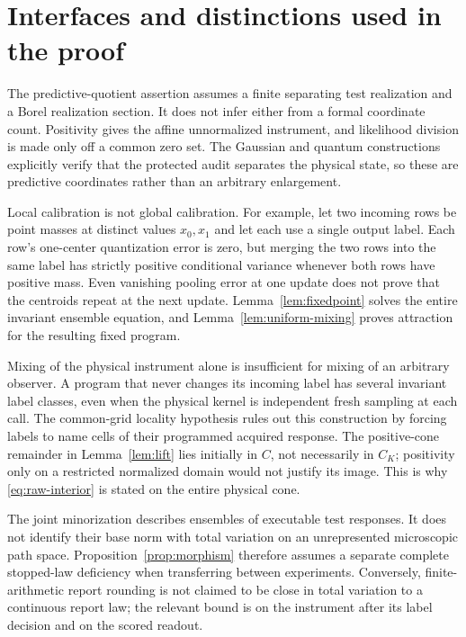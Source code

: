 \section{Interfaces and distinctions used in the proof}\label{sec:audit}
The predictive-quotient assertion assumes a finite separating test realization and a Borel realization section. It does not infer either from a formal coordinate count. Positivity gives the affine unnormalized instrument, and likelihood division is made only off a common zero set. The Gaussian and quantum constructions explicitly verify that the protected audit separates the physical state, so these are predictive coordinates rather than an arbitrary enlargement.

Local calibration is not global calibration. For example, let two incoming rows be point masses at distinct values $x_0,x_1$ and let each use a single output label. Each row's one-center quantization error is zero, but merging the two rows into the same label has strictly positive conditional variance whenever both rows have positive mass. Even vanishing pooling error at one update does not prove that the centroids repeat at the next update. Lemma~\ref{lem:fixedpoint} solves the entire invariant ensemble equation, and Lemma~\ref{lem:uniform-mixing} proves attraction for the resulting fixed program.

Mixing of the physical instrument alone is insufficient for mixing of an arbitrary observer. A program that never changes its incoming label has several invariant label classes, even when the physical kernel is independent fresh sampling at each call. The common-grid locality hypothesis rules out this construction by forcing labels to name cells of their programmed acquired response. The positive-cone remainder in Lemma~\ref{lem:lift} lies initially in $C$, not necessarily in $C_K$; positivity only on a restricted normalized domain would not justify its image. This is why \eqref{eq:raw-interior} is stated on the entire physical cone.

The joint minorization describes ensembles of executable test responses. It does not identify their base norm with total variation on an unrepresented microscopic path space. Proposition~\ref{prop:morphism} therefore assumes a separate complete stopped-law deficiency when transferring between experiments. Conversely, finite-arithmetic report rounding is not claimed to be close in total variation to a continuous report law; the relevant bound is on the instrument after its label decision and on the scored readout.

